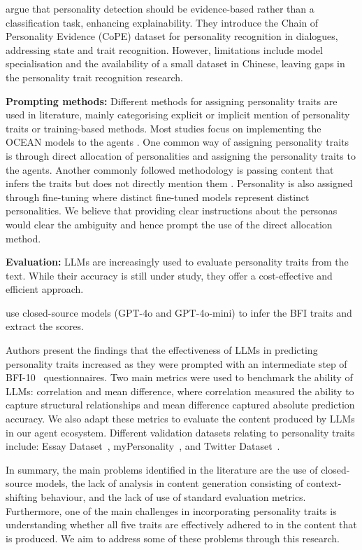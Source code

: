 \citet{sun2024revealing} argue that personality detection should be evidence-based rather than a classification task, enhancing explainability. They introduce the Chain of Personality Evidence (CoPE) dataset for personality recognition in dialogues, addressing state and trait recognition. However, limitations include model specialisation and the availability of a small dataset in Chinese, leaving gaps in the personality trait recognition research.



\noindent\textbf{Prompting methods:} Different methods for assigning personality traits are used in literature, mainly categorising explicit or implicit mention of personality traits or training-based methods. Most studies focus on implementing the OCEAN models to the agents \cite{bhandari2025evaluating, xi2025rise}. One common way of assigning personality traits is through direct allocation of personalities and assigning the personality traits to the agents\cite{}. Another commonly followed methodology is passing content that infers the traits but does not directly mention them \cite{sun2024revealing, han2024psydial}. Personality is also assigned through fine-tuning where distinct fine-tuned models represent distinct personalities. We believe that providing clear instructions about the personas would clear the ambiguity and hence prompt the use of the direct allocation method. 

\noindent\textbf{Evaluation:} LLMs are increasingly used to evaluate personality traits from the text. While their accuracy is still under study, they offer a cost-effective and efficient approach.

\citet{zhu2025investigating} use closed-source models (GPT-4o and GPT-4o-mini) to infer the BFI traits and extract the scores. 

Authors present the findings that the effectiveness of LLMs in predicting personality traits increased as they were prompted with an intermediate step of BFI-10~\cite{bfi10} questionnaires. Two main metrics were used to benchmark the ability of LLMs: correlation and mean difference, where correlation measured the ability to capture structural relationships and mean difference captured absolute prediction accuracy. We also adapt these metrics to evaluate the content produced by LLMs in our agent ecosystem. Different validation datasets relating to personality traits include: Essay Dataset~\cite{yeo-etal-2025-pado}, myPersonality~\cite{mypersonality}, and Twitter Dataset~\cite{twitterdata}.
 

In summary, the main problems identified in the literature are the use of closed-source models, the lack of analysis in content generation consisting of context-shifting behaviour, and the lack of use of standard evaluation metrics. Furthermore, one of the main challenges in incorporating personality traits is understanding whether all five traits are effectively adhered to in the content that is produced. We aim to address some of these problems through this research.